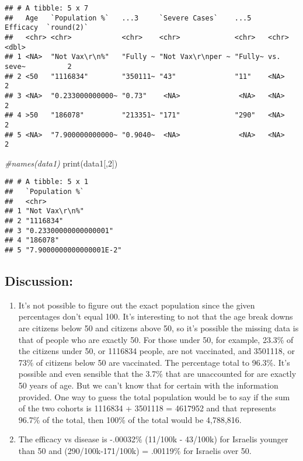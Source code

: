 \documentclass[
]{article}
\newenvironment{Shaded}{\begin{snugshade}}{\end{snugshade}}
\newcommand{\CommentTok}[1]{\textcolor[rgb]{0.56,0.35,0.01}{\textit{#1}}}
\newcommand{\DecValTok}[1]{\textcolor[rgb]{0.00,0.00,0.81}{#1}}
\newcommand{\FunctionTok}[1]{\textcolor[rgb]{0.00,0.00,0.00}{#1}}
\newcommand{\NormalTok}[1]{#1}
\begin{document}
\begin{verbatim}
## # A tibble: 5 x 7
##   Age   `Population %`   ...3     `Severe Cases`    ...5    Efficacy  `round(2)`
##   <chr> <chr>            <chr>    <chr>             <chr>   <chr>          <dbl>
## 1 <NA>  "Not Vax\r\n%"   "Fully ~ "Not Vax\r\nper ~ "Fully~ vs. seve~          2
## 2 <50   "1116834"        "350111~ "43"              "11"    <NA>               2
## 3 <NA>  "0.233000000000~ "0.73"    <NA>              <NA>   <NA>               2
## 4 >50   "186078"         "213351~ "171"             "290"   <NA>               2
## 5 <NA>  "7.900000000000~ "0.9040~  <NA>              <NA>   <NA>               2
\end{verbatim}

\begin{Shaded}
\begin{Highlighting}[]
\CommentTok{\#names(data1)}
\FunctionTok{print}\NormalTok{(data1[,}\DecValTok{2}\NormalTok{])}
\end{Highlighting}
\end{Shaded}

\begin{verbatim}
## # A tibble: 5 x 1
##   `Population %`         
##   <chr>                  
## 1 "Not Vax\r\n%"         
## 2 "1116834"              
## 3 "0.23300000000000001"  
## 4 "186078"               
## 5 "7.9000000000000001E-2"
\end{verbatim}

\begin{Shaded}
\end{Shaded}

\hypertarget{discussion}{%
\subsection{Discussion:}\label{discussion}}

\begin{enumerate}
\def\labelenumi{\arabic{enumi})}
\item
  It's not possible to figure out the exact population since the given
  percentages don't equal 100. It's interesting to not that the age
  break downs are citizens below 50 and citizens above 50, so it's
  possible the missing data is that of people who are exactly 50. For
  those under 50, for example, 23.3\% of the citizens under 50, or
  1116834 people, are not vaccinated, and 3501118, or 73\% of citizens
  below 50 are vaccinated. The percentage total to 96.3\%. It's possible
  and even sensible that the 3.7\% that are unaccounted for are exactly
  50 years of age. But we can't know that for certain with the
  information provided. One way to guess the total population would be
  to say if the sum of the two cohorts is 1116834 + 3501118 = 4617952
  and that represents 96.7\% of the total, then 100\% of the total would
  be 4,788,816.
\item
  The efficacy vs disease is -.00032\% (11/100k - 43/100k) for Israelis
  younger than 50 and (290/100k-171/100k) = .00119\% for Israelis over
  50.
\end{enumerate}
\end{document}
